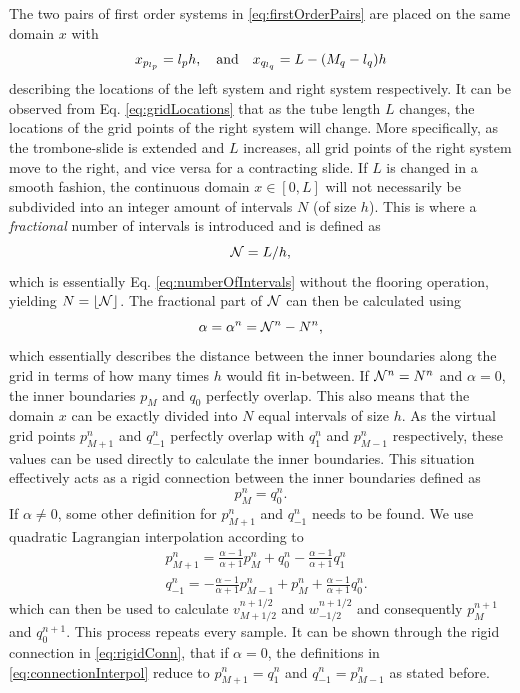 The two pairs of first order systems in \eqref{eq:firstOrderPairs} are placed on the same domain $x$ with
\begin{equation}\label{eq:gridLocations}
    x_{p_{l_p}} = {l_p} h, \quad \text{and}\quad
    x_{q_{l_q}} = L-(M_q - {l_q})h
\end{equation}
describing the locations of the left system and right system respectively. It can be observed from Eq. \eqref{eq:gridLocations} that as the tube length $L$ changes, the locations of the grid points of the right system will change. More specifically, as the trombone-slide is extended and $L$ increases, all grid points of the right system move to the right, and vice versa for a contracting slide. If $L$ is changed in a smooth fashion, the continuous domain $x \in [0,L]$ will not necessarily be subdivided into an integer amount of intervals $N$ (of size $h$). This is where a \textit{fractional} number of intervals is introduced and is defined as 
\begin{equation}
    \mathcal{N} = L/h,
\end{equation}
which is essentially Eq. \eqref{eq:numberOfIntervals} without the flooring operation, yielding $N = \lfloor \mathcal{N} \rfloor$. The fractional part of $\mathcal{N}$ can then be calculated using
\begin{equation}\label{eq:alphaDef}
    \alpha = \alpha^n = \mathcal{N}^n - N^n,
\end{equation}
which essentially describes the distance between the inner boundaries along the grid in terms of how many times $h$ would fit in-between. If $\mathcal{N}^n = N^n$ and $\alpha = 0$, the inner boundaries $p_M$ and $q_0$ perfectly overlap. This also means that the domain $x$ can be exactly divided into $N$ equal intervals of size $h$. As the virtual grid points $p_{M+1}^n$ and $q_{-1}^n$ perfectly overlap with $q_{1}^n$ and $p_{M-1}^n$ respectively, these values can be used directly to calculate the inner boundaries. This situation effectively acts as a rigid connection between the inner boundaries defined as
\begin{equation}\label{eq:rigidConn}
    p_M^n = q_0^n.
\end{equation}
%
If $\alpha \neq 0$, some other definition for $p_{M+1}^n$ and $q_{-1}^n$ needs to be found. We use quadratic Lagrangian interpolation according to
\begin{subequations}\label{eq:connectionInterpol}
\begin{align}
        &p_{M+1}^n = \frac{\alpha - 1}{\alpha + 1}p_{M}^n + q_0^n - \frac{\alpha - 1}{\alpha + 1}q_1^n
    \label{eq:calcPMp1}\\
        &q_{-1}^n
        =-\frac{\alpha - 1}{\alpha + 1}p_{M-1}^n + p_{M}^n+ \frac{\alpha - 1}{\alpha + 1}q_{0}^n.\label{eq:calcQm1}
\end{align}
\end{subequations}
which can then be used to calculate $v_{M+1/2}^{n+1/2}$ and $w_{-1/2}^{n+1/2}$ and consequently $p_M^{n+1}$ and $q_0^{n+1}$. This process repeats every sample. It can be shown through the rigid connection in \eqref{eq:rigidConn}, that if $\alpha=0$, the definitions in \eqref{eq:connectionInterpol} reduce to $p_{M+1}^n = q_1^n$ and $q_{-1}^n = p_{M-1}^n$ as stated before.

